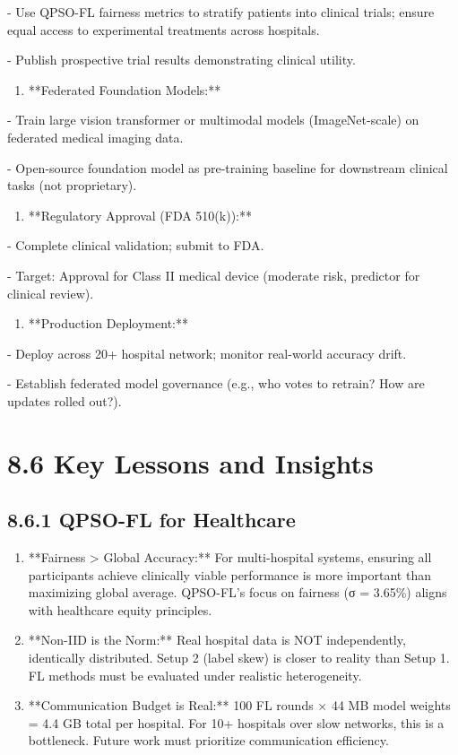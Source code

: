 - Use QPSO-FL fairness metrics to stratify patients into clinical trials; ensure equal access to experimental treatments across hospitals.

- Publish prospective trial results demonstrating clinical utility.

\begin{enumerate}
  \item **Federated Foundation Models:**
\end{enumerate}

- Train large vision transformer or multimodal models (ImageNet-scale) on federated medical imaging data.

- Open-source foundation model as pre-training baseline for downstream clinical tasks (not proprietary).

\begin{enumerate}
  \item **Regulatory Approval (FDA 510(k)):**
\end{enumerate}

- Complete clinical validation; submit to FDA.

- Target: Approval for Class II medical device (moderate risk, predictor for clinical review).

\begin{enumerate}
  \item **Production Deployment:**
\end{enumerate}

- Deploy across 20+ hospital network; monitor real-world accuracy drift.

- Establish federated model governance (e.g., who votes to retrain? How are updates rolled out?).


\section{8.6 Key Lessons and Insights}

\subsection{8.6.1 QPSO-FL for Healthcare}
\begin{enumerate}
  \item **Fairness > Global Accuracy:** For multi-hospital systems, ensuring all participants achieve clinically viable performance is more important than maximizing global average. QPSO-FL's focus on fairness (σ = 3.65\%) aligns with healthcare equity principles.
  \item **Non-IID is the Norm:** Real hospital data is NOT independently, identically distributed. Setup 2 (label skew) is closer to reality than Setup 1. FL methods must be evaluated under realistic heterogeneity.
  \item **Communication Budget is Real:** 100 FL rounds × 44 MB model weights = 4.4 GB total per hospital. For 10+ hospitals over slow networks, this is a bottleneck. Future work must prioritize communication efficiency.
\end{enumerate}


